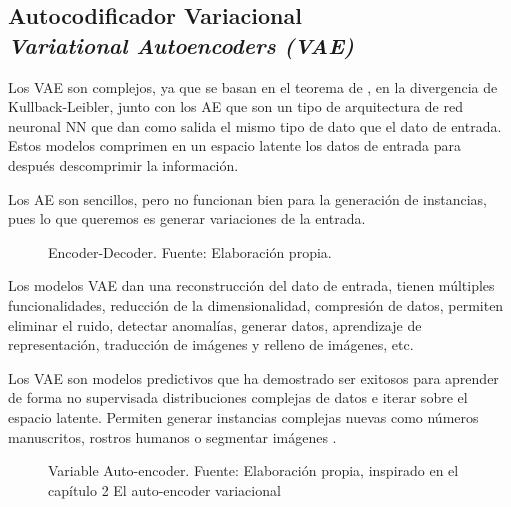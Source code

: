 \subsection[\texorpdfstring{Autocodificador Variacional \\ \textit{Variational Autoencoders (VAE)}}{Autocodificador Variacional - Variational Autoencoders (VAE)}]{Autocodificador Variacional \\ \textit{Variational Autoencoders (VAE)}}
Los \gls{VAE} son complejos, ya que se basan en el teorema de , en la divergencia de {Kullback-Leibler}, junto con los \gls{AE} que son un tipo de arquitectura de red neuronal \acrshort{NN} que dan como salida el mismo tipo de dato que el dato de entrada. Estos modelos comprimen en un espacio latente los datos de entrada para después descomprimir la información. 

Los \gls{AE} son sencillos, pero no funcionan bien para la generación de instancias, pues lo que queremos es generar variaciones de la entrada.

\begin{figure}[H]
    \centering
    
    \caption{Encoder-Decoder. \newline{}Fuente: Elaboración propia.}
    \label{fig:encoder-decoder}
\end{figure}

Los modelos \gls{VAE} dan una reconstrucción del dato de entrada, tienen múltiples funcionalidades, reducción de la dimensionalidad, compresión de datos, permiten eliminar el ruido, detectar anomalías, generar datos, aprendizaje de representación, traducción de imágenes y relleno de imágenes, etc.

Los \gls{VAE} son modelos predictivos que ha demostrado ser exitosos para aprender de forma no supervisada distribuciones complejas de datos e iterar sobre el espacio latente. Permiten generar instancias complejas nuevas como números manuscritos, rostros humanos o segmentar imágenes \cite{kingma2022autoencodingvariationalbayes}.

\begin{figure}[H]
    \centering
    
    \caption{Variable Auto-encoder. \newline{}Fuente: Elaboración propia, inspirado en el capítulo 2 El auto-encoder variacional \cite{upm71832}}
    \label{fig:variational-auto-decoder}
\end{figure}

